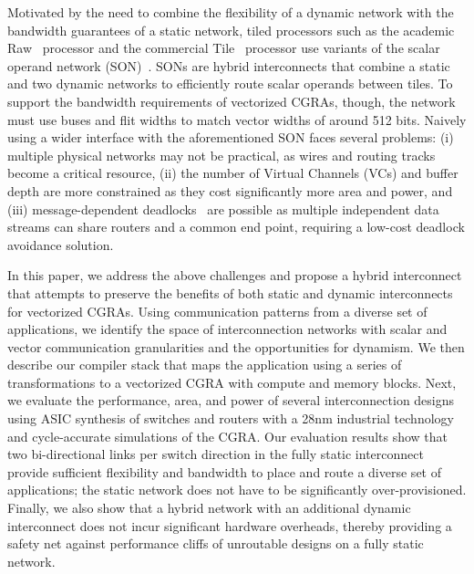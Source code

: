 Motivated by the need to combine the flexibility of a dynamic network with the bandwidth guarantees of a static network, tiled processors such as the academic Raw~\cite{raw} processor and
the commercial Tile~\cite{tile} processor use variants of the scalar operand network (SON)~\cite{son}. SONs are hybrid interconnects that combine a static and two dynamic networks to efficiently route scalar operands
between tiles. To support the bandwidth requirements of vectorized CGRAs, though, the network must use buses and flit widths to match vector widths of around 512 bits. Naively using a wider interface with the aforementioned SON faces several problems:
(i)   multiple physical networks may not be practical, as wires and routing tracks become a critical resource,
(ii)  the number of Virtual Channels (VCs) and buffer depth are more constrained as they cost significantly more area and power, and
(iii) message-dependent deadlocks~\cite{deadlock-tpds03} are possible as multiple independent data streams can share routers and a common end point, requiring a low-cost deadlock avoidance solution.

In this paper, we address the above challenges and propose a hybrid interconnect that attempts to preserve the benefits of both static and dynamic interconnects for vectorized CGRAs.
Using communication patterns from a diverse set of applications, we identify the space of interconnection networks with scalar and vector communication granularities and the
opportunities for dynamism. We then describe our compiler stack that maps the application
using a series of transformations to a vectorized CGRA with compute and memory blocks.
Next, we evaluate the performance, area, and power of several interconnection designs using ASIC synthesis of switches and routers with a 28nm industrial technology
and cycle-accurate simulations of the CGRA. Our evaluation results show that two bi-directional links per switch direction in the fully static interconnect
provide sufficient flexibility and bandwidth to place and route a diverse set of applications; the static network does not have to be significantly over-provisioned.
Finally, we also show that a hybrid network with an additional dynamic interconnect does not incur significant hardware overheads, thereby
providing a safety net against performance cliffs of unroutable designs on a fully static network.
\fi

